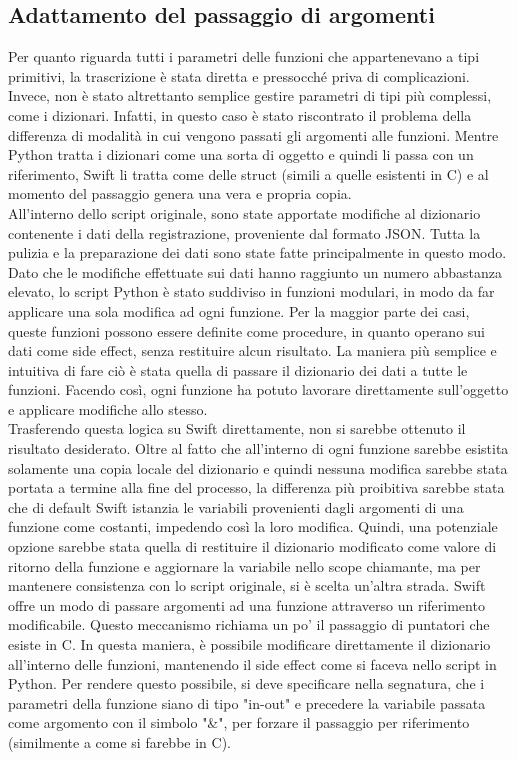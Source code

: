 \subsection{Adattamento del passaggio di argomenti}

Per quanto riguarda tutti i parametri delle funzioni che appartenevano a tipi 
primitivi, la trascrizione è stata diretta e pressocché priva di complicazioni.
Invece, non è stato altrettanto semplice gestire parametri di tipi più complessi,
come i dizionari. Infatti, in questo caso è stato riscontrato il problema della
differenza di modalità in cui vengono passati gli argomenti alle funzioni. 
Mentre Python tratta i dizionari come una sorta di oggetto e quindi li 
passa con un riferimento, Swift li tratta come delle struct (simili a quelle 
esistenti in C) e al momento del passaggio genera una vera e propria copia.\\
All'interno dello script originale, sono state apportate modifiche al dizionario
contenente i dati della registrazione, proveniente dal formato JSON. Tutta la
pulizia e la preparazione dei dati sono state fatte principalmente in questo
modo. Dato che le modifiche effettuate sui dati hanno raggiunto un numero 
abbastanza elevato, lo script Python è stato suddiviso in funzioni modulari,
in modo da far applicare una sola modifica ad ogni funzione. Per la maggior parte
dei casi, queste funzioni possono essere definite come procedure, in quanto operano 
sui dati come side effect, senza restituire alcun risultato. La maniera più semplice
e intuitiva di fare ciò è stata quella di passare il dizionario dei dati a tutte le
funzioni. Facendo così, ogni funzione ha potuto lavorare direttamente sull'oggetto 
e applicare modifiche allo stesso.\\
Trasferendo questa logica su Swift direttamente, non si sarebbe ottenuto il risultato 
desiderato. Oltre al fatto che all'interno di ogni funzione sarebbe esistita solamente 
una copia locale del dizionario e quindi nessuna modifica sarebbe stata portata a termine 
alla fine del processo, la differenza più proibitiva sarebbe stata che di default Swift
istanzia le variabili provenienti dagli argomenti di una funzione come costanti,
impedendo così la loro modifica. Quindi, una potenziale opzione
sarebbe stata quella di restituire il dizionario modificato come valore di ritorno della 
funzione e aggiornare la variabile nello scope chiamante, ma per mantenere consistenza 
con lo script originale, si è scelta un'altra strada. Swift offre un modo di passare
argomenti ad una funzione attraverso un riferimento modificabile. Questo meccanismo
richiama un po' il passaggio di puntatori che esiste in C. In questa maniera, è 
possibile modificare direttamente il dizionario all'interno delle funzioni, mantenendo
il side effect come si faceva nello script in Python. Per rendere questo possibile, si
deve specificare nella segnatura, che i parametri della funzione siano di tipo "in-out" e 
precedere la variabile passata come argomento con il simbolo "\&", per forzare il passaggio
per riferimento (similmente a come si farebbe in C).


